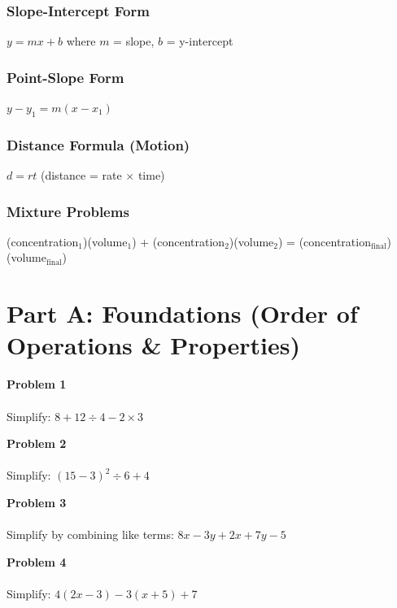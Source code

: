 \documentclass[12pt]{article}
\begin{document}
	        \subsubsection*{Slope-Intercept Form}
	    		$y = mx + b$ \quad where $m$ = slope, $b$ = y-intercept
	
            \subsubsection*{Point-Slope Form}
		    	$y - y_1 = m(x - x_1)$

            \subsubsection*{Distance Formula (Motion)}
                $d = rt$ \quad (distance = rate $\times$ time)

            \subsubsection*{Mixture Problems}
                (concentration$_1$)(volume$_1$) + (concentration$_2$)(volume$_2$) = (concentration$_{\text{final}}$)(volume$_{\text{final}}$)

            \newpage
	
        \section*{Part A: Foundations (Order of Operations \& Properties)}

            \textbf{Problem 1}\\\\
            Simplify: $8 + 12 \div 4 - 2 \times 3$

            \vspace{2.5cm}

            \textbf{Problem 2}\\\\
            Simplify: $(15 - 3)^2 \div 6 + 4$

            \vspace{2.5cm}

            \textbf{Problem 3}\\\\
            Simplify by combining like terms: $8x - 3y + 2x + 7y - 5$

            \vspace{2.5cm}

            \textbf{Problem 4}\\\\
            Simplify: $4(2x - 3) - 3(x + 5) + 7$
\end{document}
